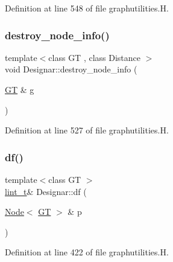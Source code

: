 Definition at line 548 of file graphutilities.\+H.

\mbox{\label{namespace_designar_a51119e58f118766eed21754bcbe93ec1}} 
\subsubsection{\texorpdfstring{destroy\+\_\+node\+\_\+info()}{destroy\_node\_info()}}
{\footnotesize\ttfamily template$<$class GT , class Distance $>$ \\
void Designar\+::destroy\+\_\+node\+\_\+info (\begin{DoxyParamCaption}\item[{\hyperlink{demo-buildgraph_8_c_a3001c40d2c31ca87ed96cd7d1334a55e}{GT} \&}]{g }\end{DoxyParamCaption})}



Definition at line 527 of file graphutilities.\+H.

\mbox{\label{namespace_designar_aacbba165f7a2d6b320e94303dc54aa2b}} 
\subsubsection{\texorpdfstring{df()}{df()}}
{\footnotesize\ttfamily template$<$class GT $>$ \\
\hyperlink{namespace_designar_a9d113d66a39e82b73727c72cd3a52f73}{lint\+\_\+t}\& Designar\+::df (\begin{DoxyParamCaption}\item[{\hyperlink{namespace_designar_a5af326c65aa2bd26b26c410f2030d09e}{Node}$<$ \hyperlink{demo-buildgraph_8_c_a3001c40d2c31ca87ed96cd7d1334a55e}{GT} $>$ \&}]{p }\end{DoxyParamCaption})\hspace{0.3cm}{\ttfamily [inline]}}



Definition at line 422 of file graphutilities.\+H.

\mbox{\label{namespace_designar_aea55a662f6563f40a64509015ca3ab10}} 

